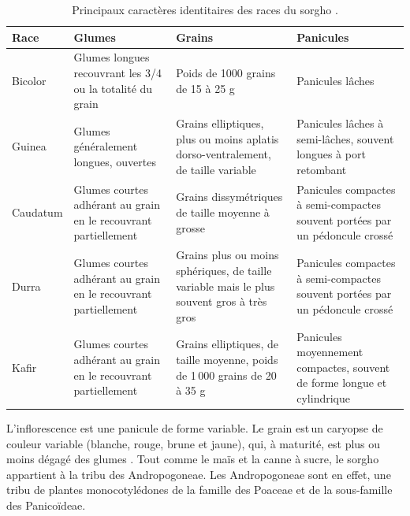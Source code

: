 \documentclass[a4paper,11pt]{article}
\begin{document}
\begin{table}
  \begin{footnotesize}
    \begin{center}
      \begin{tabular}{lb{3cm}b{3cm}b{3cm}}
        \textbf{Race} & \textbf{Glumes}  & \textbf{Grains}  & \textbf{Panicules} \\ \hline
        Bicolor & Glumes longues recouvrant les 3/4 ou la totalité du grain  & Poids de 1000 grains de 15 à 25 g & Panicules lâches \\ \hline
        Guinea & Glumes généralement longues, ouvertes & Grains elliptiques, plus ou moins aplatis dorso-ventralement, de taille variable & Panicules lâches à semi-lâches, souvent longues à port retombant \\ \hline
        Caudatum & Glumes courtes adhérant au grain en le recouvrant partiellement & Grains dissymétriques de taille moyenne à grosse & Panicules compactes à semi-compactes souvent portées par un pédoncule crossé \\ \hline
        Durra & Glumes courtes adhérant au grain en le recouvrant partiellement & Grains plus ou moins sphériques, de taille variable mais le plus souvent gros à très gros & Panicules compactes à semi-compactes souvent portées par un pédoncule crossé \\ \hline
        Kafir & Glumes courtes adhérant au grain en le recouvrant partiellement & Grains elliptiques, de taille moyenne, poids de 1\,000 grains de 20 à 35 g & Panicules moyennement compactes, souvent de forme longue et cylindrique \\ 
      \end{tabular}
      \caption{Principaux caractères identitaires des races du sorgho \protect\cite{Chantereau_2013}.}
      \label{tableau:Chantereau_2013}
    \end{center}
  \end{footnotesize}
\end{table}



\newpage



L'inflorescence est une panicule de forme variable. Le grain est\,un
caryopse de couleur variable (blanche, rouge, brune et jaune), qui, à
maturité, est plus ou moins dégagé des glumes
\cite{SaintClair_1989,Chantereau_1991}. Tout comme le maïs et la canne
à sucre, le sorgho appartient à la tribu des Andropogoneae. Les
Andropogoneae sont en effet, une tribu de plantes monocotylédones de
la famille des Poaceae et de la sous-famille des Panicoïdeae.
\end{document}

